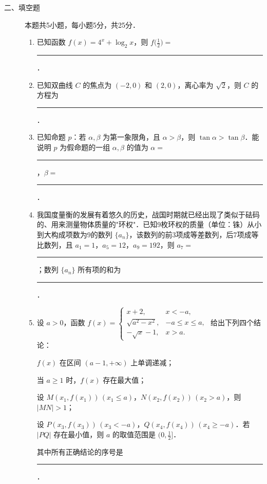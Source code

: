 \begin{description}
    \item[二、填空题] 本题共5小题，每小题5分，共25分．
    \begin{enumerate}[leftmargin=5pt]
      \addtocounter{enumi}{+10}
        \item 已知函数 $f(x)=4^x+\log_2 x$，则 $f\bigl(\frac{1}{2}\bigr)=$ \rule[-0.3ex]{3em}{0.4pt}．
        \item 已知双曲线 $C$ 的焦点为 $(-2,0)$ 和 $(2,0)$，离心率为 $\sqrt{2}$，则 $C$ 的方程为 \rule[-0.3ex]{3em}{0.4pt}．
        \item 已知命题 $p$：若 $\alpha,\beta$ 为第一象限角，且 $\alpha>\beta$，则 $\tan\alpha>\tan\beta$．能说明 $p$ 为假命题的一组 $\alpha,\beta$ 的值为 $\alpha=$ \rule[-0.3ex]{3em}{0.4pt}，$\beta=$ \rule[-0.3ex]{3em}{0.4pt}．
        \item 我国度量衡的发展有着悠久的历史，战国时期就已经出现了类似于砝码的、用来测量物体质量的"环权"．已知9枚环权的质量（单位：铢）从小到大构成项数为9的数列 $\{a_n\}$，该数列的前3项成等差数列，后7项成等比数列，且 $a_1=1$，$a_5=12$，$a_9=192$，则 $a_7=$ \rule[-0.3ex]{3em}{0.4pt}；数列 $\{a_n\}$ 所有项的和为 \rule[-0.3ex]{3em}{0.4pt}．
        \item 设 $a>0$，函数 $f(x)=\begin{cases}x+2,&x<-a,\\\sqrt{a^2-x^2},&-a\leqslant x\leqslant a,\\-\sqrt{x}-1,&x>a.\end{cases}$ 给出下列四个结论：

        $f(x)$ 在区间 $(a-1,+\infty)$ 上单调递减；
        
         当 $a\geqslant1$ 时，$f(x)$ 存在最大值；
        
         设 $M(x_1,f(x_1))\,(x_1\leqslant a)$，$N(x_2,f(x_2))\,(x_2>a)$，则 $|MN|>1$；
        
         设 $P(x_3,f(x_3))\,(x_3<-a)$，$Q(x_4,f(x_4))\,(x_4\geqslant-a)$．若 $|PQ|$ 存在最小值，则 $a$ 的取值范围是 $\bigl(0,\frac{1}{2}\bigr]$．
        
        其中所有正确结论的序号是 \rule[-0.3ex]{3em}{0.4pt}．
    \end{enumerate}
\end{description}

